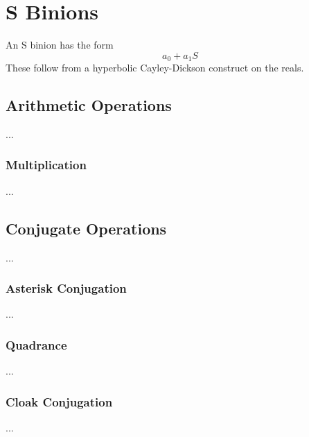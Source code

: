 \chapter{S Binions}
An S binion has the form
\begin{equation}
    a_{0} + a_{1} S
\end{equation}
These follow from a hyperbolic Cayley-Dickson construct on the reals.
\section{Arithmetic Operations}
...
\subsection{Multiplication}
...
\section{Conjugate Operations}
...
\subsection{Asterisk Conjugation}
...
\subsection{Quadrance}
...
\subsection{Cloak Conjugation}
...
